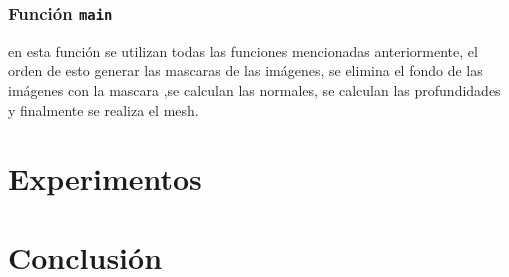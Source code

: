 \documentclass[twocolumn,11pts]{IEEEtran}
\begin{document}
\subsubsection{Función \texttt{main}}
en esta función se utilizan todas las funciones mencionadas anteriormente, el orden de esto generar las mascaras de las imágenes, se elimina el fondo de las imágenes con la mascara ,se calculan las normales, se calculan las profundidades y finalmente se realiza el mesh.


\section{Experimentos}
\section{Conclusión}






\end{document}
